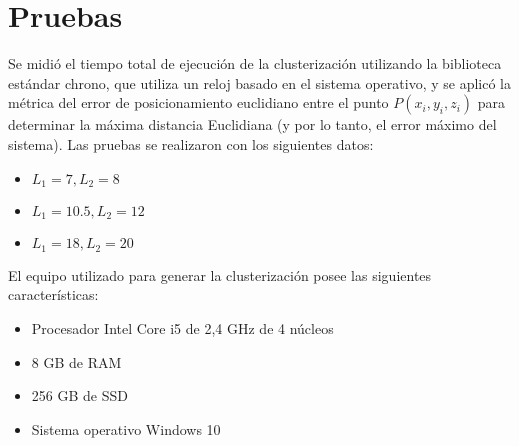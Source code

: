 \section{Pruebas}

Se midió el tiempo total de ejecución de la clusterización utilizando la biblioteca estándar chrono, que utiliza un reloj basado en el sistema operativo, y se aplicó la métrica del error de posicionamiento euclidiano entre el punto $P(x_i, y_i, z_i)$ para determinar la máxima distancia Euclidiana (y por lo tanto, el error máximo del sistema). Las pruebas se realizaron con los siguientes datos:

\begin{itemize}
	\item $L_1 = 7, L_2 = 8$
	\item $L_1 = 10.5, L_2 = 12$
	\item $L_1 = 18, L_2 = 20$
\end{itemize}

El equipo utilizado para generar la clusterización posee las siguientes características:

\begin{itemize}
	\item Procesador Intel Core i5 de 2,4 GHz de 4 núcleos
	\item 8 GB de RAM
	\item 256 GB de SSD
	\item Sistema operativo Windows 10
\end{itemize}

